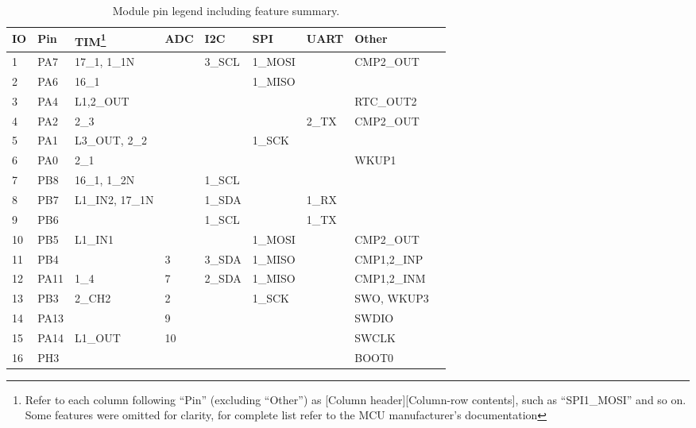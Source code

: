 \begin{table}[p]
\begin{center}
\caption{\label{table:module-pin-legend}Module pin legend including feature summary.}
    \begin{tabular}{|l|l|l|l|l|l|l|l|l|} \hline
    \textbf{IO} & \textbf{Pin} & \textbf{TIM\footnote{Refer to each column following ``Pin'' (excluding ``Other'') as [Column header][Column-row contents], such as ``SPI1\_MOSI'' and so on. Some features were omitted for clarity, for complete list refer to the MCU manufacturer's documentation}} & \textbf{ADC} & \textbf{I2C} & \textbf{SPI} & \textbf{UART} & \textbf{Other}\\ \hline
    1  & PA7  & 17\_1, 1\_1N    &     & 3\_SCL & 1\_MOSI &             & CMP2\_OUT          \\ \hline
    2  & PA6  & 16\_1          &     &       & 1\_MISO &             &                    \\ \hline
    3  & PA4  & L1,2\_OUT      &     &       &        &             & RTC\_OUT2           \\ \hline
    4  & PA2  & 2\_3           &     &       &        & 2\_TX      & CMP2\_OUT           \\ \hline
    5  & PA1  & L3\_OUT, 2\_2   &     &       & 1\_SCK  &             &                    \\ \hline
    6  & PA0  & 2\_1           &     &       &        &             & WKUP1   \\ \hline
    7  & PB8  & 16\_1, 1\_2N    &     & 1\_SCL &        &             &                    \\ \hline
    8  & PB7  & L1\_IN2, 17\_1N &     & 1\_SDA &        & 1\_RX        &                    \\ \hline
    9  & PB6  &               &     & 1\_SCL &        & 1\_TX        &                    \\ \hline
    10 & PB5  & L1\_IN1        &     &       & 1\_MOSI &             & CMP2\_OUT          \\ \hline
    11 & PB4  &               & 3   & 3\_SDA & 1\_MISO &             & CMP1,2\_INP        \\ \hline
    12 & PA11 & 1\_4           & 7   & 2\_SDA & 1\_MISO &             & CMP1,2\_INM        \\ \hline
    13 & PB3  & 2\_CH2         & 2   &       & 1\_SCK  &             & SWO, WKUP3 \\ \hline
    14 & PA13 &               & 9   &       &        &             & SWDIO            \\ \hline
    15 & PA14 & L1\_OUT        & 10  &       &        &             & SWCLK                   \\ \hline
    16 & PH3  &               &     &       &        &             & BOOT0                   \\ \hline
    \end{tabular}
\end{center}
\end{table}

